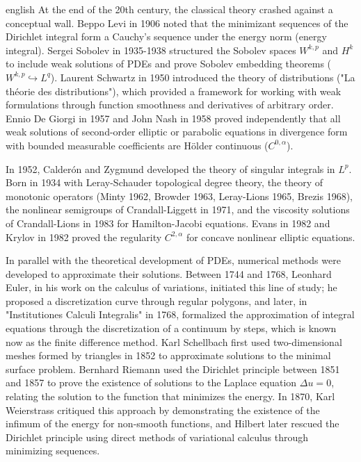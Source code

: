 \documentclass[../0000.tex]{subfiles}
\begin{document}
\begin{hyphenrules}{english}
At the end of the 20th century, the classical theory crashed against a conceptual wall. Beppo Levi in 1906 noted that the minimizant sequences of the Dirichlet 
integral form a Cauchy's sequence under the energy norm (energy integral). Sergei Sobolev in 1935-1938 structured the Sobolev spaces $W^{k,p}$ and $H^k$ to include 
weak solutions of PDEs and prove Sobolev embedding theorems ($W^{k,p} \hookrightarrow L^q$). Laurent Schwartz in 1950 introduced the theory of distributions 
("La théorie des distributions"), which provided a framework for working with weak formulations through function smoothness and derivatives of arbitrary order. 
Ennio De Giorgi in 1957 and John Nash in 1958 proved independently that all weak solutions of second-order elliptic or parabolic equations in divergence form 
with bounded measurable coefficients are Hölder continuous ($C^{0,\alpha}$).

In 1952, Calderón and Zygmund developed the theory of singular integrals in $L^p$. Born in 1934 with Leray-Schauder topological degree theory, the theory of 
monotonic operators (Minty 1962, Browder 1963, Leray-Lions 1965, Brezis 1968), the nonlinear semigroups of Crandall-Liggett in 1971, and the viscosity solutions 
of Crandall-Lions in 1983 for Hamilton-Jacobi equations. Evans in 1982 and Krylov in 1982 proved the regularity $C^{2,\alpha}$ for concave nonlinear elliptic 
equations.

In parallel with the theoretical development of PDEs, numerical methods were developed to approximate their solutions. Between 1744 and 1768, Leonhard Euler, 
in his work on the calculus of variations, initiated this line of study; he proposed a discretization curve through regular polygons, and later, 
in "Institutiones Calculi Integralis" in 1768, formalized the approximation of integral equations through the discretization of a continuum by steps, 
which is known now as the finite difference method. Karl Schellbach first used two-dimensional meshes formed by triangles in 1852 to approximate solutions to 
the minimal surface problem. Bernhard Riemann used the Dirichlet principle between 1851 and 1857 to prove the existence of solutions to the Laplace equation 
$\Delta u = 0$, relating the solution to the function that minimizes the energy. In 1870, Karl Weierstrass critiqued this approach by demonstrating the existence 
of the infimum of the energy for non-smooth functions, and Hilbert later rescued the Dirichlet principle using direct methods of variational calculus through 
minimizing sequences.


\end{hyphenrules}
\end{document}
